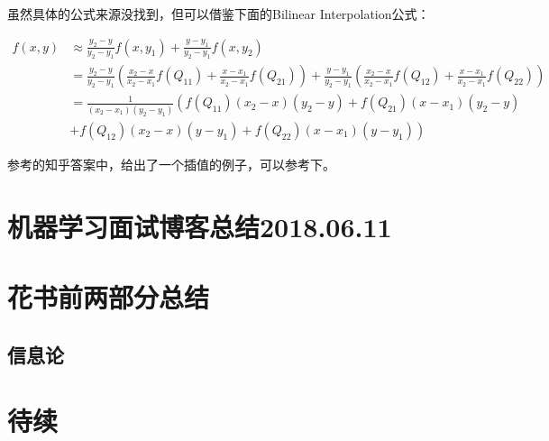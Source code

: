 虽然具体的公式来源没找到，但可以借鉴下面的Bilinear Interpolation公式：

\begin{align*}
f(x, y)  & \approx \frac{y_2 - y}{y_2 - y_1} f(x, y_1) + \frac{y-y_1}{y_2 - y_1}f(x, y_2) \\
 & =  \frac{y_2 - y}{y_2 - y_1} \left( \frac{x_2 - x}{x_2 - x_1} f(Q_{11}) + \frac{x - x_1}{x_2 - x_1} f(Q_{21}) \right) + \frac{y - y_1}{y_2 - y_1} \left( \frac{x_2 - x}{x_2 - x_1} f(Q_{12}) + \frac{x - x_1}{x_2 - x_1} f(Q_{22}) \right) \\
 & = \frac{1}{(x_2 - x_1)(y_2 - y_1)} \left( f(Q_{11})(x_2 - x)(y_2 - y) + f(Q_{21})(x - x_1)(y_2 - y) \right.\\
 & + \left. f(Q_{12})(x_2 - x)(y - y_1) + f(Q_{22})(x - x_1)(y - y_1) \right)
\end{align*}

参考的知乎答案中，给出了一个插值的例子，可以参考下。

\section{机器学习面试博客总结2018.06.11}


\section{花书前两部分总结}

\subsection{信息论}









\section{待续}













